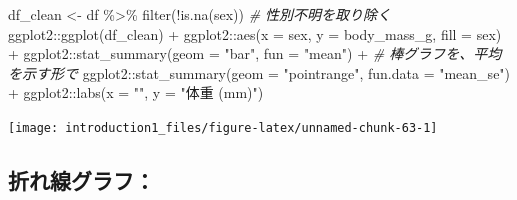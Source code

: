 \documentclass[
]{ltjsarticle}
\newenvironment{Shaded}{\begin{snugshade}}{\end{snugshade}}
\newcommand{\AttributeTok}[1]{\textcolor[rgb]{0.77,0.63,0.00}{#1}}
\newcommand{\CommentTok}[1]{\textcolor[rgb]{0.56,0.35,0.01}{\textit{#1}}}
\newcommand{\FunctionTok}[1]{\textcolor[rgb]{0.00,0.00,0.00}{#1}}
\newcommand{\NormalTok}[1]{#1}
\newcommand{\OtherTok}[1]{\textcolor[rgb]{0.56,0.35,0.01}{#1}}
\newcommand{\SpecialCharTok}[1]{\textcolor[rgb]{0.00,0.00,0.00}{#1}}
\newcommand{\StringTok}[1]{\textcolor[rgb]{0.31,0.60,0.02}{#1}}
\begin{document}
\begin{Shaded}
\begin{Highlighting}[]
\NormalTok{df\_clean }\OtherTok{\textless{}{-}}\NormalTok{ df }\SpecialCharTok{\%\textgreater{}\%}
  \FunctionTok{filter}\NormalTok{(}\SpecialCharTok{!}\FunctionTok{is.na}\NormalTok{(sex)) }\CommentTok{\# 性別不明を取り除く}
\NormalTok{ggplot2}\SpecialCharTok{::}\FunctionTok{ggplot}\NormalTok{(df\_clean) }\SpecialCharTok{+}
\NormalTok{  ggplot2}\SpecialCharTok{::}\FunctionTok{aes}\NormalTok{(}\AttributeTok{x =}\NormalTok{ sex, }\AttributeTok{y =}\NormalTok{ body\_mass\_g, }\AttributeTok{fill =}\NormalTok{ sex) }\SpecialCharTok{+}
\NormalTok{  ggplot2}\SpecialCharTok{::}\FunctionTok{stat\_summary}\NormalTok{(}\AttributeTok{geom =} \StringTok{"bar"}\NormalTok{, }\AttributeTok{fun =} \StringTok{"mean"}\NormalTok{) }\SpecialCharTok{+} \CommentTok{\# 棒グラフを、平均を示す形で}
\NormalTok{  ggplot2}\SpecialCharTok{::}\FunctionTok{stat\_summary}\NormalTok{(}\AttributeTok{geom =} \StringTok{"pointrange"}\NormalTok{, }\AttributeTok{fun.data =} \StringTok{"mean\_se"}\NormalTok{) }\SpecialCharTok{+}
\NormalTok{  ggplot2}\SpecialCharTok{::}\FunctionTok{labs}\NormalTok{(}\AttributeTok{x =} \StringTok{""}\NormalTok{, }\AttributeTok{y =} \StringTok{"体重 (mm)"}\NormalTok{)}
\end{Highlighting}
\end{Shaded}

\begin{center}\texttt{[image: introduction1\_files/figure-latex/unnamed-chunk-63-1]} \end{center}

\hypertarget{ux6298ux308cux7ddaux30b0ux30e9ux30d5}{%
\subsection{折れ線グラフ：}\label{ux6298ux308cux7ddaux30b0ux30e9ux30d5}}
\end{document}
